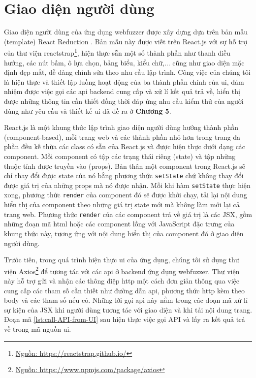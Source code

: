 \section{Giao diện người dùng}
Giao diện người dùng của ứng dụng webfuzzer được xây dựng dựa trên bản mẫu (template) React Reduction \parencite{react-reduction-github}. Bản mẫu này được viết trên React.js với sự hỗ trợ của thư viện reactstrap\footnote{\href{https://reactstrap.github.io/}{Nguồn: https://reactstrap.github.io/}}, hiện thực sẵn một số thành phần như thanh điều hướng, các nút bấm, ô lựa chọn, bảng biểu, kiểu chữ,... cũng như giao diện mặc định đẹp mắt, dễ dàng chỉnh sửa theo nhu cầu lập trình. Công việc của chúng tôi là hiện thực và thiết lập luồng hoạt động của ba thành phần chính của \acrshort{ui}, đảm nhiệm được việc gọi các \acrshort{api} backend cung cấp và xử lí kết quả trả về, hiển thị được những thông tin cần thiết đồng thời đáp ứng nhu cầu kiểm thử của người dùng như yêu cầu và thiết kế \acrshort{ui} đã đề ra ở \textbf{Chương 5}.\par
React.js là một khung thức lập trình giao diện người dùng hướng thành phần (component-based), mỗi trang web và các thành phần nhỏ hơn trong trang đa phần đều kế thừa các class có sẵn của React.js và được hiện thực dưới dạng các component. Mỗi component có tập các trạng thái riêng (state) và tập những thuộc tính được truyền vào (props). Bản thân một component trong React.js sẽ chỉ thay đổi được state của nó bằng phương thức \texttt{setState} chứ không thay đổi được giá trị của những props mà nó được nhận. Mỗi khi hàm \texttt{setState} thực hiện xong, phương thức \texttt{render} của component đó sẽ được khởi chạy, tải lại nội dung hiển thị của component theo những giá trị state mới mà không làm mới lại cả trang web. Phương thức \texttt{render} của các component trả về giá trị là các JSX, gồm những đoạn mã \acrshort{html} hoặc các component lồng với JavaScript đặc trưng của khung thức này, tương ứng với nội dung hiển thị của component đó ở giao diện người dùng.\par
Trước tiên, trong quá trình hiện thực \acrshort{ui} của ứng dụng, chúng tôi sử dụng thư viện Axios\footnote{\href{https://www.npmjs.com/package/axios}{Nguồn: https://www.npmjs.com/package/axios}} để tương tác với các \acrshort{api} ở backend ứng dụng webfuzzer. Thư viện này hỗ trợ gửi và nhận các thông điệp \acrshort{http} một cách đơn giản thông qua việc cung cấp các tham số cần thiết như đường dẫn \acrshort{api}, phương thức \acrshort{http} kèm theo body và các tham số nếu có. Những lời gọi \acrshort{api} này nằm trong các đoạn mã xử lí sự kiện của JSX khi người dùng tương tác với giao diện và khi tải nội dung trang. Đoạn mã \ref{lst:call-API-from-UI} sau hiện thực việc gọi API và lấy ra kết quả trả về trong mã nguồn \acrshort{ui}.
